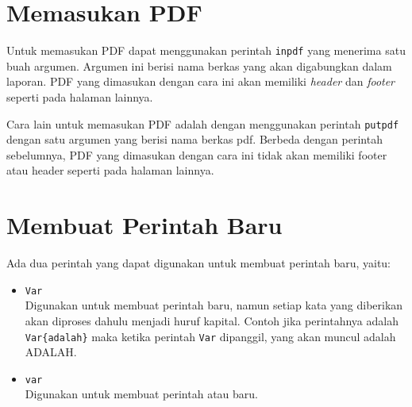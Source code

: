 \section{Memasukan PDF}
Untuk memasukan PDF dapat menggunakan perintah \texttt{\bslash inpdf} yang menerima satu 
buah argumen. Argumen ini berisi nama berkas yang akan digabungkan dalam 
laporan. PDF yang dimasukan dengan cara ini akan memiliki \textit{header} dan \textit{footer} 
seperti pada halaman lainnya. 


Cara lain untuk memasukan PDF adalah dengan menggunakan perintah \texttt{\bslash putpdf} 
dengan satu argumen yang berisi nama berkas pdf. Berbeda dengan perintah 
sebelumnya, PDF yang dimasukan dengan cara ini tidak akan memiliki footer atau 
header seperti pada halaman lainnya. 



\section{Membuat Perintah Baru}
Ada dua perintah yang dapat digunakan untuk membuat perintah baru, yaitu: 
\begin{itemize}
	\item \texttt{\bslash Var} \\
		Digunakan untuk membuat perintah baru, namun setiap kata yang diberikan
		akan diproses dahulu menjadi huruf kapital. 
		Contoh jika perintahnya adalah \texttt{\bslash Var\{adalah\}} maka ketika 
		perintah \texttt{\bslash Var} dipanggil, yang akan muncul adalah ADALAH. 
	\item \texttt{\bslash var} \\
		Digunakan untuk membuat perintah atau baru. 
\end{itemize}









